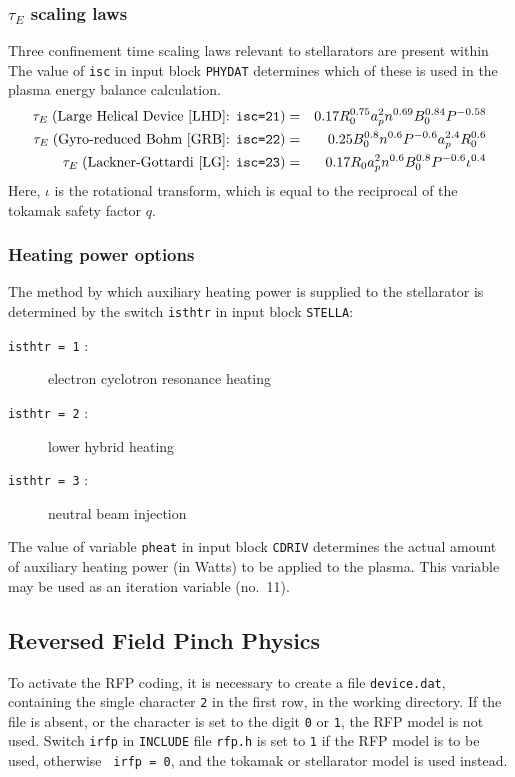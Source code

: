 \subsubsection{$\tau_E$ scaling laws}
Three confinement time scaling laws relevant to stellarators are present
within \PSD The value of {\tt isc} in input block {\tt PHYDAT} determines
which of these is used in the plasma energy balance calculation.
\begin{eqnarray}
\tau_E\; (\mbox{Large Helical Device~\cite{LHD}: {\tt isc=21}})
& = & 0.17 R_0^{0.75} a_p^2 n^{0.69} B_0^{0.84} P^{-0.58} \\
\tau_E\; (\mbox{Gyro-reduced Bohm~\cite{GRB}: {\tt isc=22}})
 & = & 0.25 B_0^{0.8} n^{0.6} P^{-0.6} a_p^{2.4} R_0^{0.6} \\
\tau_E\; (\mbox{Lackner-Gottardi~\cite{LG}: {\tt isc=23}})
& = & 0.17 R_0 a_p^2 n^{0.6} B_0^{0.8} P^{-0.6} \iota^{0.4}
\end{eqnarray}
Here, $\iota$ is the rotational transform, which is equal to the reciprocal
of the tokamak safety factor $q$.

\subsubsection{Heating power options}
The method by which auxiliary heating power is supplied to the stellarator is
determined by the switch {\tt isthtr} in input block {\tt STELLA}:
\begin{description}
\item [{\tt isthtr = 1} :] electron cyclotron resonance heating
\item [{\tt isthtr = 2} :] lower hybrid heating
\item [{\tt isthtr = 3} :] neutral beam injection
\end{description}
The value of variable {\tt pheat} in input block {\tt CDRIV} determines the
actual amount of auxiliary heating power (in Watts) to be applied to the
plasma. This variable may be used as an iteration variable (no.\ 11).

\subsection{Reversed Field Pinch Physics}

To activate the RFP coding, it is necessary to create a file {\tt device.dat},
containing the single character {\tt 2} in the first row, in the working
directory. If the file is absent, or the character is set to the digit {\tt 0}
or {\tt 1}, the RFP model is not used. Switch {\tt irfp} in {\tt INCLUDE} file
{\tt rfp.h} is set to {\tt 1} if the RFP model is to be used, otherwise {\tt
irfp = 0}, and the tokamak or stellarator model is used instead.
\setlength{\parskip}{0mm}


